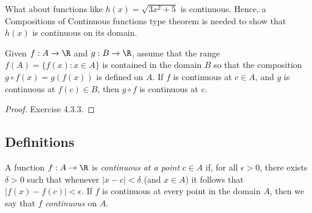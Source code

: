 What about functions like \( h(x) = \sqrt{ 3x^2 + 5  }   \) is continuous. Hence, a Compositions of Continuous functions type theorem is needed to show that \( h(x) \) is continuous on its domain.


\begin{tcolorbox}
    \begin{thm}
    Given \( f: A \to \R  \) and \( g: B \to \R  \), assume that the range \( f(A) = \{ f(x) : x \in A  \}  \) is contained in the domain \( B  \) so that the composition \( g \circ f(x) = g(f(x)) \) is defined on \( A  \). If \( f \) is continuous at \( c \in A  \), and \( g  \) is continuous at \( f(c) \in B  \), then \( g \circ f  \) is continuous at \( c  \).

    \end{thm}
\end{tcolorbox}

\begin{proof}
Exercise 4.3.3.
\end{proof}



\subsection{Definitions} 

\begin{tcolorbox}
    \begin{defn}[Continuity]
    A function \( f: A \to \R  \) is \textit{continuous at a point} \( c \in A  \) if, for all \( \epsilon > 0  \), there exists \( \delta > 0  \) such that whenever \( | x - c  | < \delta \) (and \( x \in A  \)) it follows that \( | f(x) - f(c) | < \epsilon  \). 
    If \( f \) is continuous at every point in the domain \( A  \), then we say that \( f \) \textit{continuous} on \( A  \).
    \end{defn}
\end{tcolorbox}


